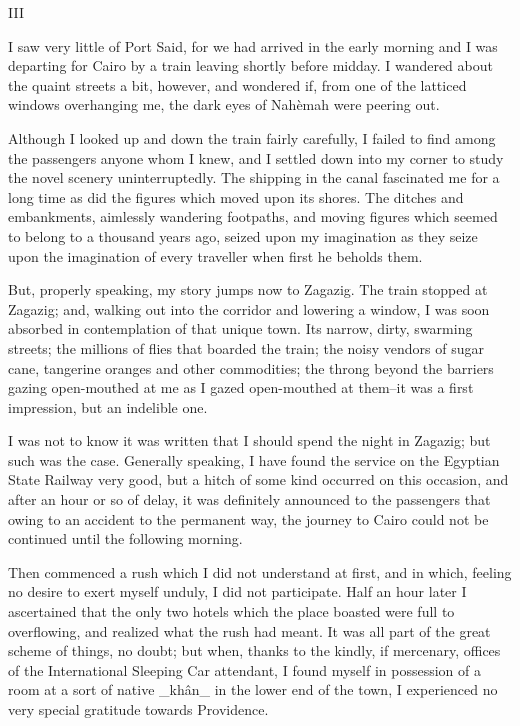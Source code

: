 III

I saw very little of Port Said, for we had arrived in the early
morning and I was departing for Cairo by a train leaving shortly
before midday. I wandered about the quaint streets a bit, however,
and wondered if, from one of the latticed windows overhanging me,
the dark eyes of Nahèmah were peering out.

Although I looked up and down the train fairly carefully, I failed to
find among the passengers anyone whom I knew, and I settled down into
my corner to study the novel scenery uninterruptedly. The shipping in
the canal fascinated me for a long time as did the figures which moved
upon its shores. The ditches and embankments, aimlessly wandering
footpaths, and moving figures which seemed to belong to a thousand
years ago, seized upon my imagination as they seize upon the
imagination of every traveller when first he beholds them.

But, properly speaking, my story jumps now to Zagazig. The train
stopped at Zagazig; and, walking out into the corridor and lowering a
window, I was soon absorbed in contemplation of that unique town. Its
narrow, dirty, swarming streets; the millions of flies that boarded
the train; the noisy vendors of sugar cane, tangerine oranges and
other commodities; the throng beyond the barriers gazing open-mouthed
at me as I gazed open-mouthed at them--it was a first impression, but
an indelible one.

I was not to know it was written that I should spend the night in
Zagazig; but such was the case. Generally speaking, I have found the
service on the Egyptian State Railway very good, but a hitch of some
kind occurred on this occasion, and after an hour or so of delay, it
was definitely announced to the passengers that owing to an accident
to the permanent way, the journey to Cairo could not be continued
until the following morning.

Then commenced a rush which I did not understand at first, and in
which, feeling no desire to exert myself unduly, I did not
participate. Half an hour later I ascertained that the only two hotels
which the place boasted were full to overflowing, and realized what
the rush had meant. It was all part of the great scheme of things, no
doubt; but when, thanks to the kindly, if mercenary, offices of the
International Sleeping Car attendant, I found myself in possession of
a room at a sort of native _khân_ in the lower end of the town, I
experienced no very special gratitude towards Providence.

